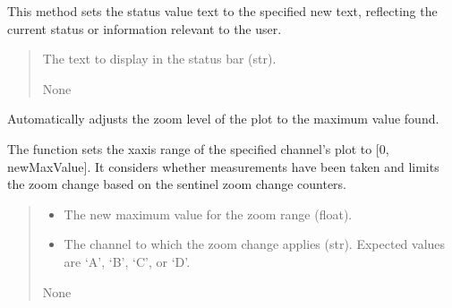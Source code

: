 \documentclass[letterpaper,10pt,english]{sphinxmanual}
\begin{document}
\begin{fulllineitems}
\begin{fulllineitems}
\sphinxAtStartPar
This method sets the status value text to the specified new text, 
reflecting the current status or information relevant to the user.
\begin{quote}\begin{description}
\sphinxAtStartPar
{} \textendash{} The text to display in the status bar (str).

\sphinxAtStartPar
None

\end{description}\end{quote}

\end{fulllineitems}


\begin{fulllineitems}
\label{\detokenize{StartStopHist:StartStopHist.StartStopLogic.changeZoomMax}}
\pysigstartsignatures
{}
\pysigstopsignatures
\sphinxAtStartPar
Automatically adjusts the zoom level of the plot to the maximum value found.

\sphinxAtStartPar
The function sets the x\sphinxhyphen{}axis range of the specified channel’s plot to {[}0, newMaxValue{]}.
It considers whether measurements have been taken and limits the zoom change based on 
the sentinel zoom change counters.
\begin{quote}\begin{description}
\begin{itemize}
\item {} 
\sphinxAtStartPar
{} \textendash{} The new maximum value for the zoom range (float).

\item {} 
\sphinxAtStartPar
{} \textendash{} The channel to which the zoom change applies (str).
Expected values are ‘A’, ‘B’, ‘C’, or ‘D’.

\end{itemize}

\sphinxAtStartPar
None

\end{description}\end{quote}


\end{fulllineitems}
\end{fulllineitems}
\end{document}
